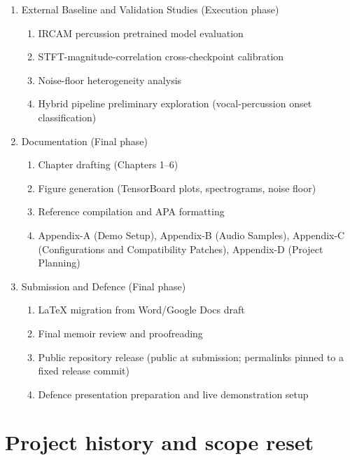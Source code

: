 \documentclass[a4paper,11pt,oneside,openany]{book}
\begin{document}
\begin{appendices}
\begin{enumerate}
  \begin{enumerate}
  \item \texttt{drums\_v1} -- \texttt{c16\_r10} $\to$ partial transient response
  \item \texttt{drums\_v2} -- \texttt{v2.gin} $+$ causal $\to$ terminated before completion
  \end{enumerate}
\item External Baseline and Validation Studies (Execution phase)
  \begin{enumerate}
  \item IRCAM percussion pretrained model evaluation
  \item STFT-magnitude-correlation cross-checkpoint calibration
  \item Noise-floor heterogeneity analysis
  \item Hybrid pipeline preliminary exploration (vocal-percussion onset classification)
  \end{enumerate}
\item Documentation (Final phase)
  \begin{enumerate}
  \item Chapter drafting (Chapters 1--6)
  \item Figure generation (TensorBoard plots, spectrograms, noise floor)
  \item Reference compilation and APA formatting
  \item Appendix-A (Demo Setup), Appendix-B (Audio Samples), Appendix-C (Configurations and Compatibility Patches), Appendix-D (Project Planning)
  \end{enumerate}
\item Submission and Defence (Final phase)
  \begin{enumerate}
  \item LaTeX migration from Word/Google Docs draft
  \item Final memoir review and proofreading
  \item Public repository release (public at submission; permalinks pinned to a fixed release commit)
  \item Defence presentation preparation and live demonstration setup
  \end{enumerate}
\end{enumerate}

\section{Project history and scope reset}


\end{appendices}
\end{document}
